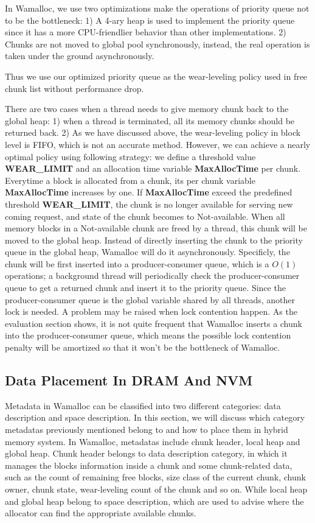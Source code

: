 \documentclass[10pt, conference, compsocconf]{IEEEtran}
\begin{document}
In Wamalloc, we use two optimizations make the operations of priority queue not to be the bottleneck:
1) A 4-ary heap is used to implement the priority queue since it has a more CPU-friendlier behavior than other implementations.
2) Chunks are not moved to global pool synchronously, instead, the real operation is taken under the ground asynchronously.

Thus we use our optimized priority queue as the wear-leveling policy used in free chunk list without performance drop.

There are two cases when a thread needs to give memory chunk back to the global heap: 
1) when a thread is terminated, all its memory chunks should be returned back.
2) As we have discussed above, the wear-leveling policy in block level is FIFO, which is not an accurate method.
However, we can achieve a nearly optimal policy using following strategy: 
we define a threshold value \textbf{WEAR\_LIMIT} and an allocation time variable \textbf{MaxAllocTime} per chunk. 
Everytime a block is allocated from a chunk, its per chunk variable \textbf{MaxAllocTime} increases by one.
If \textbf{MaxAllocTime} exceed the predefined threshold \textbf{WEAR\_LIMIT}, 
the chunk is no longer available for serving new coming request, and state of the chunk becomes to Not-available.
When all memory blocks in a Not-available chunk are freed by a thread, this chunk will be moved to the global heap.
Instead of directly inserting the chunk to the priority queue in the global heap, Wamalloc will do it asynchronously.
Specificly, the chunk will be first inserted into a producer-consumer queue, which is a $O(1)$ operations;
a background thread will periodically check the producer-consumer queue to get a returned chunk and insert it to the priority queue.
Since the producer-consumer queue is the global variable shared by all threads, another lock is needed.
A problem may be raised when lock contention happen.
As the evaluation section shows, it is not quite frequent that Wamalloc inserts a chunk into the producer-consumer queue,
which means the possible lock contention penalty will be amortized so that it won't be the bottleneck of Wamalloc.

\subsection{Data Placement In DRAM And NVM}

Metadata in Wamalloc can be classified into two different categories: data description and space description.
In this section, we will discuss which category metadatas previously mentioned belong to and how to place them in hybrid memory system.
In Wamalloc, metadatas include chunk header, local heap and global heap.
Chunk header belongs to data description category, 
in which it manages the blocks information inside a chunk and some chunk-related data, 
such as the count of remaining free blocks, size class of the current chunk,
chunk owner, chunk state, wear-leveling count of the chunk and so on.
While local heap and global heap belong to space description,
which are used to advise where the allocator can find the appropriate available chunks.
\end{document}

